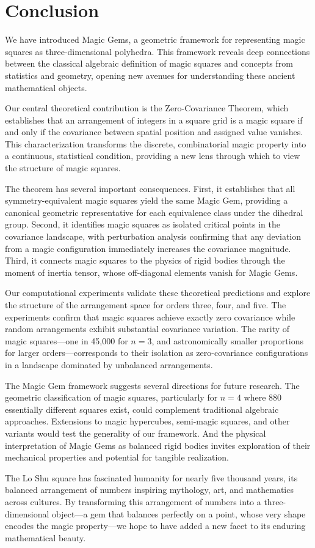 \section{Conclusion}
\label{sec:conclusion}

We have introduced Magic Gems, a geometric framework for representing magic squares 
as three-dimensional polyhedra.
This framework reveals deep connections between the classical algebraic definition of magic squares
and concepts from statistics and geometry, opening new avenues for understanding these ancient mathematical objects.

Our central theoretical contribution is the Zero-Covariance Theorem, 
which establishes that an arrangement of integers in a square grid is a magic square 
if and only if the covariance between spatial position and assigned value vanishes.
This characterization transforms the discrete, combinatorial magic property
into a continuous, statistical condition,
providing a new lens through which to view the structure of magic squares.

The theorem has several important consequences.
First, it establishes that all symmetry-equivalent magic squares yield the same Magic Gem,
providing a canonical geometric representative for each equivalence class under the dihedral group.
Second, it identifies magic squares as isolated critical points in the covariance landscape,
with perturbation analysis confirming that any deviation from a magic configuration 
immediately increases the covariance magnitude.
Third, it connects magic squares to the physics of rigid bodies through the moment of inertia tensor,
whose off-diagonal elements vanish for Magic Gems.

Our computational experiments validate these theoretical predictions 
and explore the structure of the arrangement space for orders three, four, and five.
The experiments confirm that magic squares achieve exactly zero covariance
while random arrangements exhibit substantial covariance variation.
The rarity of magic squares---one in 45,000 for $n = 3$, 
and astronomically smaller proportions for larger orders---corresponds to their isolation
as zero-covariance configurations in a landscape dominated by unbalanced arrangements.

The Magic Gem framework suggests several directions for future research.
The geometric classification of magic squares, particularly for $n = 4$ where 880 essentially different squares exist,
could complement traditional algebraic approaches.
Extensions to magic hypercubes, semi-magic squares, and other variants would test the generality of our framework.
And the physical interpretation of Magic Gems as balanced rigid bodies 
invites exploration of their mechanical properties and potential for tangible realization.

The Lo Shu square has fascinated humanity for nearly five thousand years,
its balanced arrangement of numbers inspiring mythology, art, and mathematics across cultures.
By transforming this arrangement of numbers into a three-dimensional object---a gem 
that balances perfectly on a point, whose very shape encodes the magic property---we 
hope to have added a new facet to its enduring mathematical beauty.
